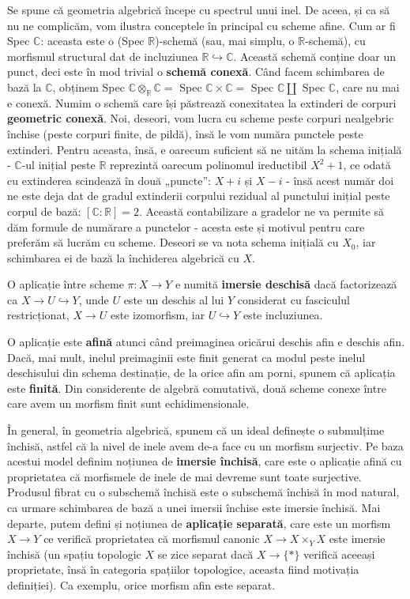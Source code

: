 \documentclass[13pt,openany,oneside]{book}
\begin{document}
Se spune că geometria algebrică începe cu spectrul unui inel. De aceea, și ca să nu ne complicăm, vom ilustra conceptele în principal cu scheme afine. Cum ar fi Spec $\mathbb{C}$: aceasta este o (Spec $\mathbb{R}$)-schemă (sau, mai simplu, o $\mathbb{R}$-schemă), cu morfismul structural dat de incluziunea $\mathbb{R}  \hookrightarrow \mathbb{C}$. Această schemă conține doar un punct, deci este în mod trivial o {\bf schemă conexă}. Când facem schimbarea de bază la $\mathbb{C}$, obținem Spec $\mathbb{C} \otimes_{\mathbb{R}} \mathbb{C} =$ Spec $\mathbb{C} \times \mathbb{C} =$ Spec $\mathbb{C} \coprod$ Spec $\mathbb{C}$, care nu mai e conexă. Numim o schemă care își păstrează conexitatea la extinderi de corpuri {\bf geometric conexă}. Noi, deseori, vom lucra cu scheme peste corpuri nealgebric închise (peste corpuri finite, de pildă), însă le vom număra punctele peste extinderi. Pentru aceasta, însă, e oarecum suficient să ne uităm la schema inițială - $\mathbb{C}$-ul inițial peste $\mathbb{R}$ reprezintă oarecum polinomul ireductibil $X^2+1$, ce odată cu extinderea scindează în două „puncte”: $X+i$ și $X-i$ - însă acest număr doi ne este deja dat de gradul extinderii corpului rezidual al punctului inițial peste corpul de bază: $[\mathbb{C}:\mathbb{R}]=2$. Această contabilizare a gradelor ne va permite să dăm formule de numărare a punctelor - acesta este și motivul pentru care preferăm să lucrăm cu scheme. Deseori se va nota schema inițială cu $X_0$, iar schimbarea ei de bază la închiderea algebrică cu $X$.

O aplicație între scheme $\pi: X \to Y$ e numită {\bf imersie deschisă} dacă factorizează ca $X \to U \hookrightarrow Y$, unde $U$ este un deschis al lui $Y$ considerat cu fasciculul restricționat, $X \to U$ este izomorfism, iar $U \hookrightarrow Y$ este incluziunea.

O aplicație este {\bf afină} atunci când preimaginea oricărui deschis afin e deschis afin. Dacă, mai mult, inelul preimaginii este finit generat ca modul peste inelul deschisului din schema destinație, de la orice afin am porni, spunem că aplicația este {\bf finită}. Din considerente de algebră comutativă, două scheme conexe între care avem un morfism finit sunt echidimensionale.

În general, în geometria algebrică, spunem că un ideal definește o submulțime închisă, astfel că la nivel de inele avem de-a face cu un morfism surjectiv. Pe baza acestui model definim noțiunea de {\bf imersie închisă}, care este o aplicație afină cu proprietatea că morfismele de inele de mai devreme sunt toate surjective. Produsul fibrat cu o subschemă închisă este o subschemă închisă în mod natural, ca urmare schimbarea de bază a unei imersii închise este imersie închisă. Mai departe, putem defini și noțiunea de {\bf aplicație separată}, care este un morfism $X \to Y$ ce verifică proprietatea că morfismul canonic $X \to X \times_Y X$ este imersie închisă (un spațiu topologic $X$ se zice separat dacă $X \to \{*\}$ verifică aceeași proprietate, însă în categoria spațiilor topologice, aceasta fiind motivația definiției). Ca exemplu, orice morfism afin este separat.
\end{document}

